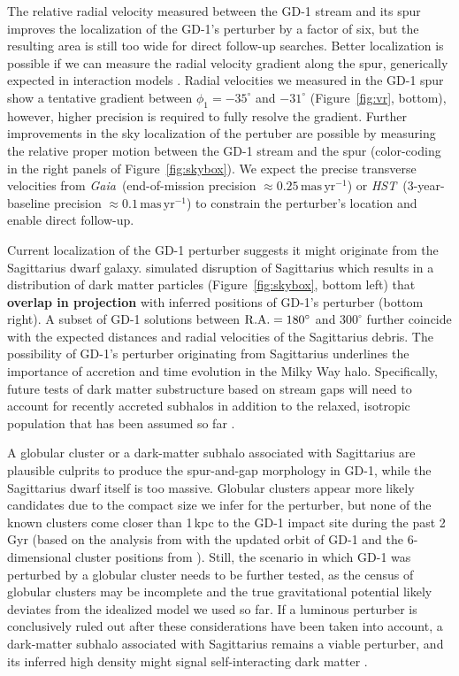 \documentclass[twocolumn]{aastex63}
\newcommand{\gaia}{\textsl{Gaia}}
\newcommand{\hst}{\textsl{HST}}
\newcommand{\masyr}{\ensuremath{\textrm{mas}\,\textrm{yr}^{-1}}}
\newcommand{\changes}[1]{{\textbf{#1}}}
\begin{document}
The relative radial velocity measured between the GD-1 stream and its spur improves the localization of the GD-1's perturber by a factor of six, but the resulting area is still too wide for direct follow-up searches.
Better localization is possible if we can measure the radial velocity gradient along the spur, generically expected in interaction models \citep{bonaca2019a}.
Radial velocities we measured in the GD-1 spur show a tentative gradient between $\phi_1=-35^\circ$ and $-31^\circ$ (Figure~\ref{fig:vr}, bottom), however, higher precision is required to fully resolve the gradient.
Further improvements in the sky localization of the pertuber are possible by measuring the relative proper motion between the GD-1 stream and the spur (color-coding in the right panels of Figure~\ref{fig:skybox}).
We expect the precise transverse velocities from \gaia\ (end-of-mission precision $\approx0.25\,\masyr$) or \hst\ (3-year-baseline precision $\approx0.1\,\masyr$) to constrain the perturber's location and enable direct follow-up.

Current localization of the GD-1 perturber suggests it might originate from the Sagittarius dwarf galaxy.
\citet{dl2017} simulated disruption of Sagittarius which results in a distribution of dark matter particles (Figure~\ref{fig:skybox}, bottom left) that \changes{overlap in projection} with inferred positions of GD-1's perturber (bottom right).
A subset of GD-1 solutions between $\rm R.A.=180^\circ$ and $300^\circ$ further coincide with the expected distances and radial velocities of the Sagittarius debris.
The possibility of GD-1's perturber originating from Sagittarius underlines the importance of accretion and time evolution in the Milky Way halo.
Specifically, future tests of dark matter substructure based on stream gaps will need to account for recently accreted subhalos in addition to the relaxed, isotropic population that has been assumed so far \citep[e.g.,][]{erkal2016, banik2019}.

A globular cluster or a dark-matter subhalo associated with Sagittarius are plausible culprits to produce the spur-and-gap morphology in GD-1, while the Sagittarius dwarf itself is too massive.
Globular clusters appear more likely candidates due to the compact size we infer for the perturber, but none of the known clusters come closer than 1\,kpc to the GD-1 impact site during the past 2\,Gyr (based on the analysis from \citealt{bonaca2019a} with the updated orbit of GD-1 and the 6-dimensional cluster positions from \citealt{baumgardt2019}).
Still, the scenario in which GD-1 was perturbed by a globular cluster needs to be further tested, as the census of globular clusters may be incomplete and the true gravitational potential likely deviates from the idealized model we used so far.
If a luminous perturber is conclusively ruled out after these considerations have been taken into account, a dark-matter subhalo associated with Sagittarius remains a viable perturber, and its inferred high density might signal self-interacting dark matter \citep[e.g.,][]{kahlhoefer2019}.
\end{document}

